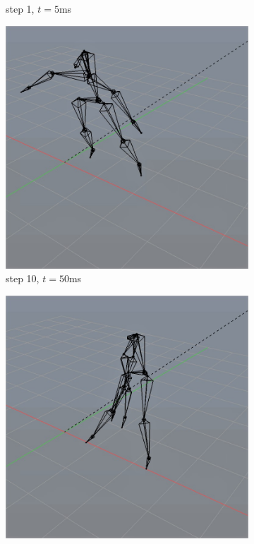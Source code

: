 \documentclass[10pt,twocolumn,letterpaper]{article}
\begin{document}
\begin{figure}[]
\begin{subfigure}{0.2\textwidth}
        \caption{step 1, $t=5$ms}
    \end{subfigure}\begin{subfigure}{0.2\textwidth}
        \centering
        \includegraphics[width=.9\linewidth]{linear-cannon-50.jpg}
        \caption{step 10, $t=50$ms}
    \end{subfigure}\begin{subfigure}{0.2\textwidth}
        \centering
        \includegraphics[width=.9\linewidth]{linear-cannon-500.jpg}

\end{subfigure}
\end{figure}
\end{document}
